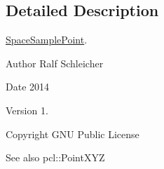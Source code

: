 \subsection{\-Detailed \-Description}
\hyperlink{structnext__best__view_1_1SpaceSamplePoint}{\-Space\-Sample\-Point}. 

\begin{DoxyAuthor}{\-Author}
\-Ralf \-Schleicher 
\end{DoxyAuthor}
\begin{DoxyDate}{\-Date}
2014 
\end{DoxyDate}
\begin{DoxyVersion}{\-Version}
1. 
\end{DoxyVersion}
\begin{DoxyCopyright}{\-Copyright}
\-G\-N\-U \-Public \-License 
\end{DoxyCopyright}
\begin{DoxySeeAlso}{\-See also}
pcl\-::\-Point\-X\-Y\-Z 
\end{DoxySeeAlso}


